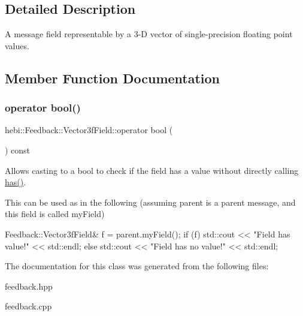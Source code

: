 \subsection{Detailed Description}
A message field representable by a 3-\/D vector of single-\/precision floating point values. 

\subsection{Member Function Documentation}
\mbox{\label{classhebi_1_1Feedback_1_1Vector3fField_a236d1c0aee3fea79769c9da36f1e1fbb}} 
\subsubsection{\texorpdfstring{operator bool()}{operator bool()}}
{\footnotesize\ttfamily hebi\+::\+Feedback\+::\+Vector3f\+Field\+::operator bool (\begin{DoxyParamCaption}{ }\end{DoxyParamCaption}) const\hspace{0.3cm}{\ttfamily [explicit]}}



Allows casting to a bool to check if the field has a value without directly calling {\ttfamily \hyperlink{classhebi_1_1Feedback_1_1Vector3fField_a0484daa9aba07fe04f80467bf6501b0e}{has()}}. 

This can be used as in the following (assuming \textquotesingle{}parent\textquotesingle{} is a parent message, and this field is called \textquotesingle{}my\+Field\textquotesingle{}) 
\begin{DoxyCode}
Feedback::Vector3fField& f = parent.myField();
\textcolor{keywordflow}{if} (f)
  std::cout << \textcolor{stringliteral}{"Field has value!"} << std::endl;
\textcolor{keywordflow}{else}
  std::cout << \textcolor{stringliteral}{"Field has no value!"} << std::endl;
\end{DoxyCode}
 

The documentation for this class was generated from the following files\+:\begin{DoxyCompactItemize}
\item 
feedback.\+hpp\item 
feedback.\+cpp\end{DoxyCompactItemize}
